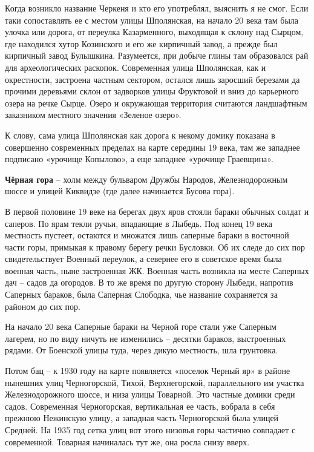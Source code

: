 Когда возникло название Черкеня и кто его употреблял, выяснить я не смог. Если таки сопоставлять ее с местом улицы Шполянская, на начало 20 века там была улочка или дорога, от переулка Казарменного, выходящая к склону над Сырцом, где находился хутор Козинского и его же кирпичный завод, а прежде был кирпичный завод Булышкина. Разумеется, при добыче глины там образовался рай для археологических раскопок. Современная улица Шполянская, как и окрестности, застроена частным сектором, остался лишь заросший березами да прочими деревьями склон от задворков улицы Фруктовой и вниз до карьерного озера на речке Сырце. Озеро и окружающая территория считаются ландшафтным заказником местного значения «Зеленое озеро».

К слову, сама улица Шполянская как дорога к некому домику показана в совершенно современных пределах на карте середины 19 века, там же западнее подписано «урочище Копылово», а еще западнее «урочище Граевщина».\\

\medskip

\textbf{Чёрная гора} – холм между бульваром Дружбы Народов, Железнодорожным шоссе и улицей Киквидзе (где далее начинается Бусова гора). 

В первой половине 19 веке на берегах двух яров стояли бараки обычных солдат и саперов. По ярам текли ручьи, впадающие в Лыбедь. Под конец 19 века местность пустеет, остаются и множатся лишь саперные бараки в восточной части горы, примыкая к правому берегу речки Бусловки. Об их следе до сих пор свидетельствует Военный переулок, а севернее его в советское время была военная часть, ныне застроенная ЖК. Военная часть возникла на месте Саперных дач – садов да огородов. В то же время по другую сторону Лыбеди, напротив Саперных бараков, была Саперная Слободка, чье название сохраняется за районом до сих пор.

На начало 20 века Саперные бараки на Черной горе стали уже Саперным лагерем, но по виду ничуть не изменились – десятки бараков, выстроенных рядами. От Боенской улицы туда, через дикую местность, шла грунтовка. 

Потом бац – к 1930 году на карте появляется «поселок Черный яр» в районе нынешних улиц Черногорской, Тихой, Верхнегорской, параллельного им участка Железнодорожного шоссе, и низа улицы Товарной. Это частные домики среди садов. Современная Черногорская, вертикальная ее часть, вобрала в себя прежнюю Нежинскую улицу, а западная часть Черногорской была улицей Средней. На 1935 год сетка улиц вот этого низовья горы частично совпадает с современной. Товарная начиналась тут же, она росла снизу вверх. 

